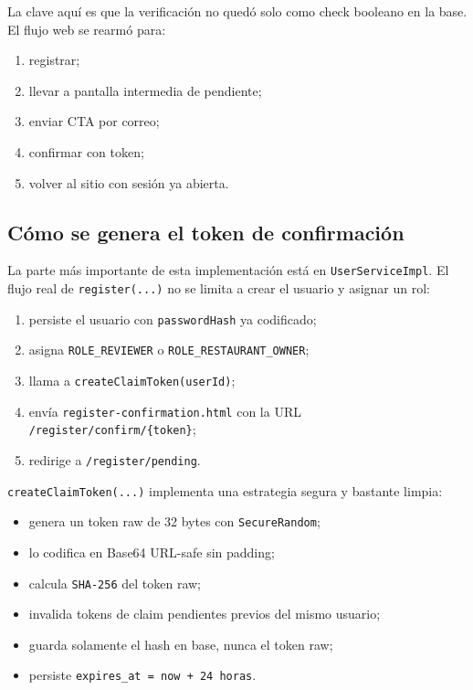 \documentclass[11pt,a4paper]{report}
\newcommand{\code}[1]{\nolinkurl{#1}}
\begin{document}
La clave aqu\'i es que la verificaci\'on no qued\'o solo como check booleano en la base. El flujo web se rearm\'o para:

\begin{enumerate}
  \item registrar;
  \item llevar a pantalla intermedia de pendiente;
  \item enviar CTA por correo;
  \item confirmar con token;
  \item volver al sitio con sesi\'on ya abierta.
\end{enumerate}

\subsection{C\'omo se genera el token de confirmaci\'on}

La parte m\'as importante de esta implementaci\'on est\'a en \code{UserServiceImpl}. El flujo real de \code{register(...)} no se limita a crear el usuario y asignar un rol:

\begin{enumerate}
  \item persiste el usuario con \code{passwordHash} ya codificado;
  \item asigna \code{ROLE\_REVIEWER} o \code{ROLE\_RESTAURANT\_OWNER};
  \item llama a \code{createClaimToken(userId)};
  \item env\'ia \code{register-confirmation.html} con la URL \code{/register/confirm/\{token\}};
  \item redirige a \code{/register/pending}.
\end{enumerate}

\code{createClaimToken(...)} implementa una estrategia segura y bastante limpia:

\begin{itemize}
  \item genera un token raw de 32 bytes con \code{SecureRandom};
  \item lo codifica en Base64 URL-safe sin padding;
  \item calcula \code{SHA-256} del token raw;
  \item invalida tokens de claim pendientes previos del mismo usuario;
  \item guarda solamente el hash en base, nunca el token raw;
  \item persiste \code{expires\_at = now + 24 horas}.
\end{itemize}
\end{document}
